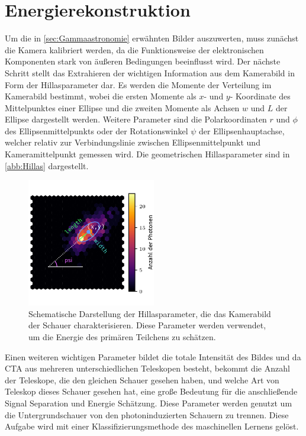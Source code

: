 \section{Energierekonstruktion}

Um die in \autoref{sec:Gammaastronomie} erwähnten Bilder auszuwerten, muss zunächst die Kamera kalibriert werden, da die Funktionsweise der elektronischen
Komponenten stark von äußeren Bedingungen beeinflusst wird.
Der nächste Schritt stellt das Extrahieren der wichtigen Information aus dem Kamerabild in Form der Hillasparameter dar.
Es werden die Momente der Verteilung im Kamerabild bestimmt, wobei die ersten Momente als $x$- und $y$- Koordinate des Mittelpunktes einer Ellipse und die zweiten Momente als Achsen $w$ und $L$ der Ellipse
dargestellt werden.
Weitere Parameter sind die Polarkoordinaten $r$ und $\phi$ des Ellipsenmittelpunkts oder der Rotationswinkel $\psi$
der Ellipsenhauptachse, welcher relativ zur Verbindungslinie zwischen Ellipsenmittelpunkt und Kameramittelpunkt gemessen wird.
Die geometrischen Hillasparameter sind in \autoref{abb:Hillas} dargestellt.
\begin{figure}
  \includegraphics[width=0.5\textwidth]{Plots/hillas_2.pdf}
  \centering
  \caption{Schematische Darstellung der Hillasparameter, die das Kamerabild der Schauer charakterisieren. Diese Parameter
            werden verwendet, um die Energie des primären Teilchens zu schätzen.~\cite{Hillas_Max}}
  \label{abb:Hillas}
\end{figure}
Einen weiteren wichtigen Parameter bildet die totale Intensität des Bildes und da CTA aus mehreren unterschiedlichen Teleskopen besteht, bekommt die Anzahl
der Teleskope, die den gleichen Schauer gesehen haben, und welche Art von Teleskop dieses Schauer gesehen hat, eine große Bedeutung für die anschließende
Signal Separation und Energie Schätzung.
Diese Parameter werden genutzt um die Untergrundschauer von den photoninduzierten Schauern zu trennen.
Diese Aufgabe wird mit einer Klassifizierungsmethode des maschinellen Lernens gelöst.

